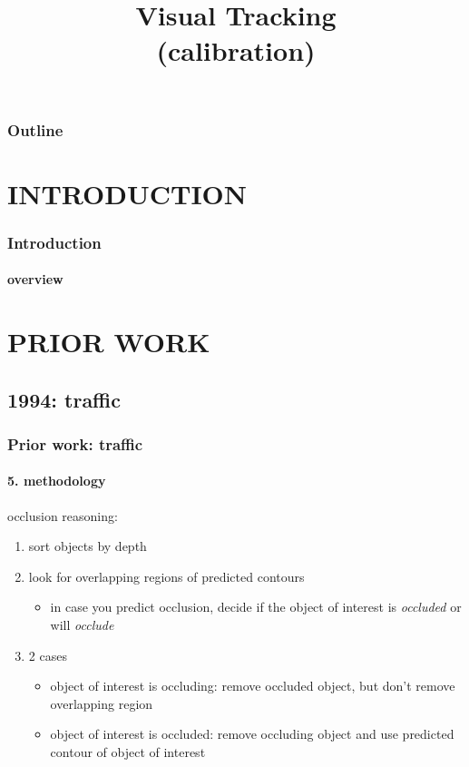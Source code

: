 
\title{Visual Tracking \\ (calibration)}
\begin{frame}[plain]\logoTechTower
	\titlepage
\end{frame}

\begin{frame}
\frametitle{Outline}
\logoCSIPCPL\logoTechTower
	\setcounter{tocdepth}{1}	
	\tableofcontents
\end{frame}

\section{INTRODUCTION}
\begin{frame}
\frametitle{Introduction}
\framesubtitle{overview}
\logoCSIPCPL\mypagenum
\end{frame}

\section{PRIOR WORK}
\subsection{1994: traffic}
\begin{frame}
\frametitle{Prior work: traffic}
\framesubtitle{5. methodology}
\logoCSIPCPL\mypagenum
{}
	occlusion reasoning:
	\begin{enumerate}
		\item sort objects by depth
		\item look for overlapping regions of predicted contours
			\begin{itemize}
				\item in case you predict occlusion, decide if the object of interest is \emph{occluded} or will \emph{occlude}
			\end{itemize}
		\item 2 cases
			\begin{itemize}
				\item object of interest is occluding: remove occluded object, but don't remove overlapping region
				\item object of interest is occluded: remove occluding object and use predicted contour of object of interest
			\end{itemize}
	\end{enumerate}
\end{frame}


\printbibliography

